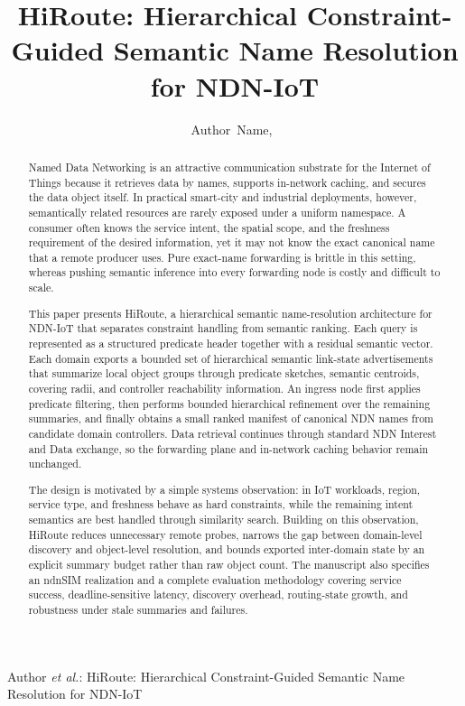 \documentclass[journal]{IEEEtran}
\newcommand{\sysname}{HiRoute}
\begin{document}
\title{HiRoute: Hierarchical Constraint-Guided Semantic Name Resolution for NDN-IoT}

\author{Author~Name,~}

%
{Author \MakeLowercase{\textit{et al.}}: HiRoute: Hierarchical Constraint-Guided Semantic Name Resolution for NDN-IoT}

\maketitle

\begin{abstract}
Named Data Networking is an attractive communication substrate for the Internet of Things because it retrieves data by names, supports in-network caching, and secures the data object itself. In practical smart-city and industrial deployments, however, semantically related resources are rarely exposed under a uniform namespace. A consumer often knows the service intent, the spatial scope, and the freshness requirement of the desired information, yet it may not know the exact canonical name that a remote producer uses. Pure exact-name forwarding is brittle in this setting, whereas pushing semantic inference into every forwarding node is costly and difficult to scale.

This paper presents \sysname{}, a hierarchical semantic name-resolution architecture for NDN-IoT that separates constraint handling from semantic ranking. Each query is represented as a structured predicate header together with a residual semantic vector. Each domain exports a bounded set of hierarchical semantic link-state advertisements that summarize local object groups through predicate sketches, semantic centroids, covering radii, and controller reachability information. An ingress node first applies predicate filtering, then performs bounded hierarchical refinement over the remaining summaries, and finally obtains a small ranked manifest of canonical NDN names from candidate domain controllers. Data retrieval continues through standard NDN Interest and Data exchange, so the forwarding plane and in-network caching behavior remain unchanged.

The design is motivated by a simple systems observation: in IoT workloads, region, service type, and freshness behave as hard constraints, while the remaining intent semantics are best handled through similarity search. Building on this observation, \sysname{} reduces unnecessary remote probes, narrows the gap between domain-level discovery and object-level resolution, and bounds exported inter-domain state by an explicit summary budget rather than raw object count. The manuscript also specifies an ndnSIM realization and a complete evaluation methodology covering service success, deadline-sensitive latency, discovery overhead, routing-state growth, and robustness under stale summaries and failures.
\end{abstract}
\end{document}
